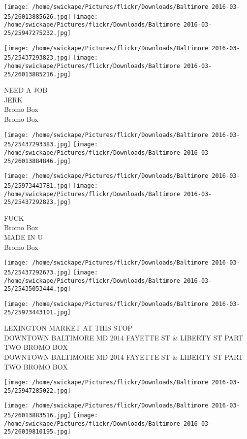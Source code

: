 \documentclass[10pt,letterpaper]{article}
\begin{document}
\texttt{[image: /home/swickape/Pictures/flickr/Downloads/Baltimore 2016-03-25/26013885626.jpg]}
\texttt{[image: /home/swickape/Pictures/flickr/Downloads/Baltimore 2016-03-25/25947275232.jpg]}

\texttt{[image: /home/swickape/Pictures/flickr/Downloads/Baltimore 2016-03-25/25437293823.jpg]}
\texttt{[image: /home/swickape/Pictures/flickr/Downloads/Baltimore 2016-03-25/26013885216.jpg]}

NEED A JOB\\
JERK\\
Bromo Box\\
Bromo Box
\pagebreak

\texttt{[image: /home/swickape/Pictures/flickr/Downloads/Baltimore 2016-03-25/25437293383.jpg]}
\texttt{[image: /home/swickape/Pictures/flickr/Downloads/Baltimore 2016-03-25/26013884846.jpg]}

\texttt{[image: /home/swickape/Pictures/flickr/Downloads/Baltimore 2016-03-25/25973443781.jpg]}
\texttt{[image: /home/swickape/Pictures/flickr/Downloads/Baltimore 2016-03-25/25437292823.jpg]}

FUCK\\
Bromo Box\\
MADE IN U\\
Bromo Box
\pagebreak

\texttt{[image: /home/swickape/Pictures/flickr/Downloads/Baltimore 2016-03-25/25437292673.jpg]}
\texttt{[image: /home/swickape/Pictures/flickr/Downloads/Baltimore 2016-03-25/25435053444.jpg]}

\texttt{[image: /home/swickape/Pictures/flickr/Downloads/Baltimore 2016-03-25/25973443101.jpg]}

LEXINGTON MARKET AT THIS STOP\\
DOWNTOWN BALTIMORE MD 2014 FAYETTE ST \& LIBERTY ST PART TWO BROMO BOX\\
DOWNTOWN BALTIMORE MD 2014 FAYETTE ST \& LIBERTY ST PART TWO BROMO BOX
\pagebreak

\texttt{[image: /home/swickape/Pictures/flickr/Downloads/Baltimore 2016-03-25/25947285022.jpg]}

\vspace{0.25in}
\texttt{[image: /home/swickape/Pictures/flickr/Downloads/Baltimore 2016-03-25/26013883516.jpg]}
\texttt{[image: /home/swickape/Pictures/flickr/Downloads/Baltimore 2016-03-25/26039810195.jpg]}
\end{document}
